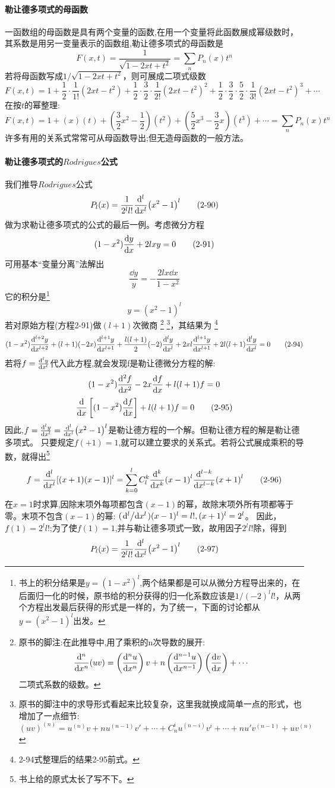 \paragraph*{勒让德多项式的母函数}一函数组的母函数是具有两个变量的函数,在用一个变量将此函数展成幂级数时，其系数是用另一变量表示的函数组,勒让德多项式的母函数是
\[F(x,t)=\frac{1}{\sqrt{1-2xt+t^2}}=\sum_nP_n(x)t^n \tag{2-87}\]
若将母函数写成$1/\sqrt{1-2xt+t^2}$，则可展成二项式级数
\[F(x,t)=1+\frac{1}{2} \cdot \frac{1}{1!}(2xt-t^2)+\frac{1}{2} \cdot \frac{3}{2} \cdot \frac{1}{2!}(2xt-t^2)^2+\frac{1}{2} \cdot \frac{3}{2} \cdot \frac{5}{2} \cdot \frac{1}{3!}(2xt-t^2)^3+ \cdots \tag{2-88}\]
在按$t$的幂整理:
\[F(x,t)=1+(x)(t)+\left(\frac{3}{2}x^2-\frac{1}{2}\right)(t^2)+\left(\frac{5}{2}x^3-\frac{3}{2}x\right)(t^3)+\cdots=\sum_nP_n(x)t^n \tag{2-89}\]
许多有用的关系式常常可从母函数导出;但无造母函数的一般方法。

\paragraph*{勒让德多项式的$Rodrigues$公式}我们推导$Rodrigues$公式
\[P_l(x)=\frac{1}{2^ll!}\dv[l]{x}(x^2-1)^l \tag{2-90}\]
做为求勒让德多项式的公式的最后一例。考虑微分方程
\[(1-x^2)\dv{y}{x}+2lxy=0 \tag{2-91}\]
可用基本“变量分离”法解出
\[\frac{\dd{y}}{y}=-\frac{2lx\dd{x}}{1-x^2} \tag{2-92}\]
它的积分是\footnote{书上的积分结果是$y=(1-x^2)^l$,两个结果都是可以从微分方程导出来的，在后面归一化的时候，原书给的积分获得的归一化系数应该是$1/(-2)^ll!$，从两个方程出发最后获得的形式是一样的，为了统一，下面的讨论都从$y=(x^2-1)^l$出发。}
\[y=(x^2-1)^l \tag{2-93}\]
若对原始方程(方程2-91)做$(l+1)$次微商
\footnote{原书的脚注:在此推导中,用了乘积的n次导数的展开:\[\dv[n]{x}(uv)=\left(\dv[n]{u}{x}\right)v+n\left(\dv[n-1]{u}{x}\right)\left(\dv{v}{x}\right)+\cdots\]二项式系数的级数。}
\footnote{原书的脚注中的求导形式看起来比较复杂，这里我就换成简单一点的形式，也增加了一点细节:\[(uv)^{(n)}=u^{(n)}v+nu^{(n-1)}v'+\cdots+C_n^iu^{(n-i)}v^{i}+\cdots+nu'v^{(n-1)}+uv^{(n)}\]}，其结果为
\footnote{2-94式整理后的结果2-95前式。}
\[(1-x^2)\dv[l+2]{y}{x}+(l+1)(-2x)\dv[l+1]{y}{x}+\frac{l(l+1)}{2}(-2)\dv[l]{y}{x}+2xl\dv[l+1]{y}{x}+2l(l+1)\dv[l]{y}{x}=0 \tag{2-94}\]
若将$f=\dv[l]{y}{x}$代入此方程,就会发现f是勒让德微分方程的解:
\[(1-x^2)\dv[2]{f}{x}-2x\dv{f}{x}+l(l+1)f=0\]
\[\dv{x} \left [(1-x^2) \dv{f}{x} \right ]+l(l+1)f=0 \tag{2-95}\]
因此,$f=\dv[l]{y}{x}=\dv[l]{x}(x^2-1)^l$是勒让德方程的一个解。但勒让德方程的解是勒让德多项式。
只要规定$f(+1)=1$,就可以建立要求的关系式。若将公式展成乘积的导数，就得出\footnote{书上给的原式太长了写不下。}
\[f=\dv[l]{x}[(x+1)(x-1)]^l=\sum_{k=0}^lC_l^k\dv[k]{x}(x-1)^l\dv[l-k]{x}(x+1)^l \tag{2-96}\]
在$x=1$时求算,因除末项外每项都包含$(x-1)$的幂，故除末项外所有项都等于零。末项不包含$(x-1)$的幂: $(\dv*[l]{x})(x-1)^l=l!,(x+1)^l=2^l$。
因此，$f(1)=2^ll!$;为了使$f(1)=1$,并与勒让德多项式一致，故用因子$2^ll!$除，得到
\[P_l(x)=\frac{1}{2^ll!}\dv[l]{x}(x^2-1)^l \tag{2-97}\]

